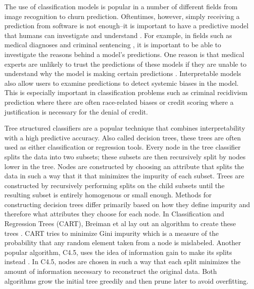\documentclass[]{article}
\theoremstyle{definition}
\begin{document}
The use of classification models is popular in a number of different fields from image recognition to churn prediction.
Oftentimes, however, simply receiving a prediction from software is not enough--it is important to have a predictive model that humans can investigate and understand \cite{Ruping06, Bratko97, Quinlan99, Martens11, Freitas14}.
For example, in fields such as medical diagnoses \cite{BellazziZu08} and criminal sentencing \cite{LarsonMaKiAn16}, it is important to be able to investigate the reasons behind a model's predictions.
One reason is that medical experts are unlikely to trust the predictions of these models if they are unable to understand why the model is making certain predictions \cite{Lavrač99}.
Interpretable models also allow users to examine predictions to detect systemic biases in the model.
This is especially important in classification problems such as criminal recidivism prediction where there are often race-related biases\cite{LarsonMaKiAn16} or credit scoring where a justification is necessary for the denial of credit\cite{BaesensMuDeVaSe05}.

Tree structured classifiers are a popular technique that combines interpretability with a high predictive accuracy.
Also called decision trees, these trees are often used as either classification or regression tools.
Every node in the tree classifier splits the data into two subsets; these subsets are then recursively split by nodes lower in the tree.
Nodes are constructed by choosing an attribute that splits the data in such a way that it that minimizes the impurity of each subset.
Trees are constructed by recursively performing splits on the child subsets until the resulting subset is entirely homogenous or small enough.
Methods for constructing decision trees differ primarily based on how they define impurity and therefore what attributes they choose for each node.
In Classification and Regression Trees (CART), Breiman et al lay out an algorithm to create these trees \cite{BreimanFrOlSt84}.
CART tries to minimize Gini impurity which is a measure of the probability that any random element taken from a node is mislabeled.
Another popular algorithm, C4.5, uses the idea of information gain to make its splits instead \cite{Quinlan93}.
In C4.5, nodes are chosen in such a way that each split minimizes the amount of information necessary to reconstruct the original data.
Both algorithms grow the initial tree greedily and then prune later to avoid overfitting.
\end{document}

